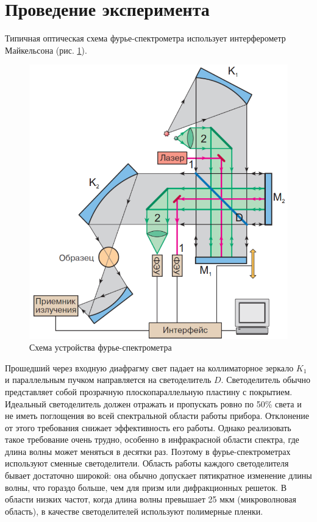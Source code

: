 \section{Проведение эксперимента}
Типичная оптическая схема фурье-спектрометра использует интерферометр Майкельсона (рис. \ref{ust}). 
\begin{figure}[h!]
	\centering
	\includegraphics[height=0.7\textheight]{ust}
	\caption{Схема устройства фурье-спектрометра}
	\label{ust}
\end{figure}
Прошедший через входную диафрагму
свет падает на коллиматорное зеркало $K_1$ и параллельным пучком направляется на светоделитель $D$. Светоделитель обычно представляет
собой прозрачную плоскопараллельную пластину с покрытием.
Идеальный светоделитель должен отражать и пропускать ровно по
50\% света и не иметь поглощения во всей спектральной области работы
прибора. Отклонение от этого требования снижает эффективность его
работы. Однако реализовать такое требование очень трудно, особенно
в инфракрасной области спектра, где длина волны может меняться в
десятки раз. Поэтому в фурье-спектрометрах используют сменные светоделители. Область работы каждого светоделителя бывает достаточно
широкой: она обычно допускает пятикратное изменение длины волны,
что гораздо больше, чем для призм или дифракционных решеток. В
области низких частот, когда длина волны превышает 25 мкм (микроволновая область), в качестве светоделителей используют полимерные
пленки.

